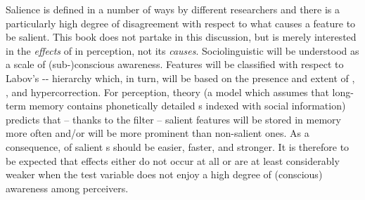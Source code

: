 Salience is defined in a number of ways by different researchers and there is a particularly high degree of disagreement with respect to what causes a feature to be salient.
This book does not partake in this discussion, but is merely interested in the \emph{effects} of  in perception, not its \emph{causes}.
Sociolinguistic  will be understood as a scale of (sub-)conscious awareness.
Features will be classified with respect to Labov's -- hierarchy which, in turn, will be based on the presence and extent of , , and hypercorrection.
For perception,  theory (a model which assumes that long-term memory contains phonetically detailed s indexed with social information) predicts that -- thanks to the  filter -- salient features will be stored in memory more often and/or will be more prominent than non-salient ones.
As a consequence,  of salient s should be easier, faster, and stronger.
It is therefore to be expected that   effects either do not occur at all or are at least considerably weaker when the test variable does not enjoy a high degree of (conscious) awareness among perceivers.
